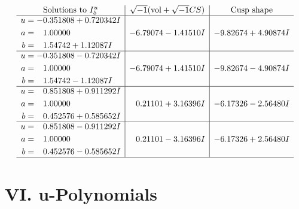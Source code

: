 \documentclass[1p]{elsarticle_modified}
\theoremstyle{definition}
\newcommand{\I}{\sqrt{-1}}
\begin{document}
$$\begin{array}{c|c|c}  
\text{Solutions to }I^u_{5}& \I (\text{vol} + \sqrt{-1}CS) & \text{Cusp shape}\\
 \hline 
\begin{aligned}
u &= -0.351808 + 0.720342 I \\
a &= \phantom{-}1.00000\phantom{ +0.000000I} \\
b &= \phantom{-}1.54742 + 1.12087 I\end{aligned}
 & -6.79074 - 1.41510 I & -9.82674 + 4.90874 I \\ \hline\begin{aligned}
u &= -0.351808 - 0.720342 I \\
a &= \phantom{-}1.00000\phantom{ +0.000000I} \\
b &= \phantom{-}1.54742 - 1.12087 I\end{aligned}
 & -6.79074 + 1.41510 I & -9.82674 - 4.90874 I \\ \hline\begin{aligned}
u &= \phantom{-}0.851808 + 0.911292 I \\
a &= \phantom{-}1.00000\phantom{ +0.000000I} \\
b &= \phantom{-}0.452576 + 0.585652 I\end{aligned}
 & \phantom{-}0.21101 + 3.16396 I & -6.17326 - 2.56480 I \\ \hline\begin{aligned}
u &= \phantom{-}0.851808 - 0.911292 I \\
a &= \phantom{-}1.00000\phantom{ +0.000000I} \\
b &= \phantom{-}0.452576 - 0.585652 I\end{aligned}
 & \phantom{-}0.21101 - 3.16396 I & -6.17326 + 2.56480 I\\
 \hline 
 \end{array}$$\newpage
\newpage\renewcommand{\arraystretch}{1}
\centering \section*{ VI. u-Polynomials}
\end{document}
